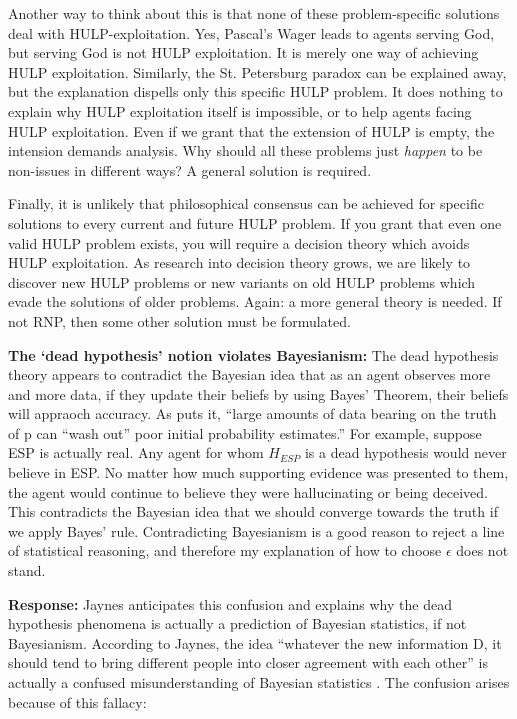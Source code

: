 \documentclass{article}
\begin{document}
Another way to think about this is that none of these problem-specific solutions deal with HULP-exploitation. Yes, Pascal's Wager leads to agents serving God, but serving God is not HULP exploitation. It is merely one way of achieving HULP exploitation. Similarly, the St. Petersburg paradox can be explained away, but the explanation dispells only this specific HULP problem. It does nothing to explain why HULP exploitation itself is impossible, or to help agents facing HULP exploitation. Even if we grant that the extension of HULP is empty, the intension demands analysis. Why should all these problems just \textit{happen} to be non-issues in different ways? A general solution is required. 

Finally, it is unlikely that philosophical consensus can be achieved for specific solutions to every current and future HULP problem. If you grant that even one valid HULP problem exists, you will require a decision theory which avoids HULP exploitation. As research into decision theory grows, we are likely to discover new HULP problems \textemdash{} or new variants on old HULP problems \textemdash{} which evade the solutions of older problems. Again: a more general theory is needed. If not RNP, then some other solution must be formulated.

\textbf{The `dead hypothesis' notion violates Bayesianism:} The dead hypothesis theory appears to contradict the Bayesian idea that as an agent observes more and more data, if they update their beliefs by using Bayes' Theorem, their beliefs will appraoch accuracy. As \citep[pg. 56]{resnik1987choices} puts it, ``large amounts of data bearing on the truth of p can ``wash out'' poor initial probability estimates.'' For example, suppose ESP is actually real. Any agent for whom \(H_{ESP}\) is a dead hypothesis would never believe in ESP. No matter how much supporting evidence was presented to them, the agent would continue to believe they were hallucinating or being deceived. This contradicts the Bayesian idea that we should converge towards the truth if we apply Bayes' rule. Contradicting Bayesianism is a good reason to reject a line of statistical reasoning, and therefore my explanation of how to choose \(\epsilon\) does not stand.

\textbf{Response:} Jaynes anticipates this confusion and explains why the dead hypothesis phenomena is actually a prediction of Bayesian statistics, if not Bayesianism. According to Jaynes, the idea ``whatever the new information D, it should tend to bring different people into closer agreement with each other'' is actually a confused misunderstanding of Bayesian statistics \citep[pg. 127]{jaynes2003probability}. The confusion arises because of this fallacy: 
\end{document}
